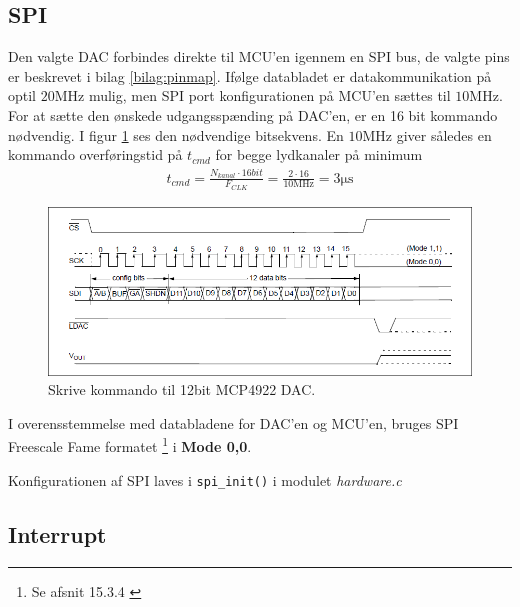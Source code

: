 \subsection{SPI}
Den valgte DAC forbindes direkte til MCU'en igennem en SPI bus, de valgte pins er beskrevet i bilag \ref{bilag:pinmap}.
Ifølge databladet er datakommunikation på optil $20\si{\mega\hertz}$ mulig, men SPI port konfigurationen på MCU'en sættes til $10\si{\mega\hertz}$.
For at sætte den ønskede udgangsspænding på DAC'en, er en 16 bit kommando nødvendig. 
I figur \ref{fig:dac12bit_writecmd} ses den nødvendige bitsekvens.
En $10\si{\mega\hertz}$ giver således en kommando overføringstid på $t_{cmd}$ for begge lydkanaler på minimum 
\begin{align}
	t_{cmd} = \frac{N_{kanal} \cdot 16bit}{F_{CLK}} = \frac{2 \cdot 16}{10\si{\mega\hertz}} = 3\si{\micro\second}
\end{align}

\begin{figure}[h!]
	\centering
	\includegraphics[width=.8\textwidth]{billeder/dac12bit_writecmd.png}
	\caption{Skrive kommando til 12bit MCP4922 DAC.\cite[s. 25]{mcp4922}}
	\label{fig:dac12bit_writecmd}
\end{figure}

I overensstemmelse med databladene for DAC'en og MCU'en, bruges SPI Freescale Fame formatet \footnote{Se afsnit 15.3.4 \cite[s. 954]{tm4c123gh6pm}} i \textbf{Mode 0,0}.


Konfigurationen af SPI laves i \texttt{spi\_init()} i modulet \textit{hardware.c}


\FloatBlock

\subsection{Interrupt}



